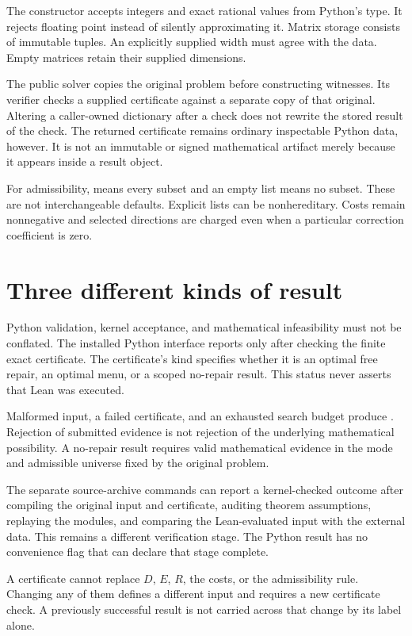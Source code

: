 The constructor accepts integers and exact rational values from Python's  type. It rejects floating point instead of silently approximating it. Matrix storage consists of immutable tuples. An explicitly supplied width must agree with the data. Empty matrices retain their supplied dimensions.

The public solver copies the original problem before constructing witnesses. Its verifier checks a supplied certificate against a separate copy of that original. Altering a caller-owned dictionary after a check does not rewrite the stored result of the check. The returned certificate remains ordinary inspectable Python data, however. It is not an immutable or signed mathematical artifact merely because it appears inside a result object.

For admissibility,  means every subset and an empty list means no subset. These are not interchangeable defaults. Explicit lists can be nonhereditary. Costs remain nonnegative and selected directions are charged even when a particular correction coefficient is zero.

\section{Three different kinds of result}

Python validation, kernel acceptance, and mathematical infeasibility must not be conflated. The installed Python interface reports  only after checking the finite exact certificate. The certificate's kind specifies whether it is an optimal free repair, an optimal menu, or a scoped no-repair result. This status never asserts that Lean was executed.

Malformed input, a failed certificate, and an exhausted search budget produce . Rejection of submitted evidence is not rejection of the underlying mathematical possibility. A no-repair result requires valid mathematical evidence in the mode and admissible universe fixed by the original problem.

The separate source-archive commands can report a kernel-checked outcome after compiling the original input and certificate, auditing theorem assumptions, replaying the modules, and comparing the Lean-evaluated input with the external data. This remains a different verification stage. The Python result has no convenience flag that can declare that stage complete.

\begin{scopebox}[title=The evidence stays attached to the original problem]
A certificate cannot replace $D$, $E$, $R$, the costs, or the admissibility rule. Changing any of them defines a different input and requires a new certificate check. A previously successful result is not carried across that change by its label alone.
\end{scopebox}

